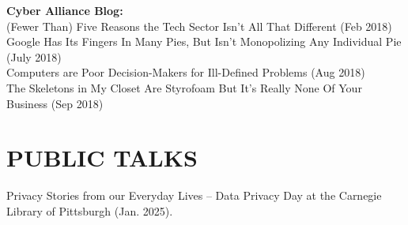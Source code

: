 \documentclass{res}
\begin{document}
\begin{resume}
\textbf{Cyber Alliance Blog:} \\         
    (Fewer Than) Five Reasons the Tech Sector Isn't All That Different (Feb 2018) \\
    Google Has Its Fingers In Many Pies, But Isn't Monopolizing Any Individual Pie (July 2018) \\
    Computers are Poor Decision-Makers for Ill-Defined Problems (Aug 2018) \\
    The Skeletons in My Closet Are Styrofoam But It's Really None Of Your Business (Sep 2018) 


\section{PUBLIC TALKS}  
\vspace{0.1in}
Privacy Stories from our Everyday Lives -- Data Privacy Day at the Carnegie Library of Pittsburgh (Jan. 2025). \\



\end{resume}
\end{document}
